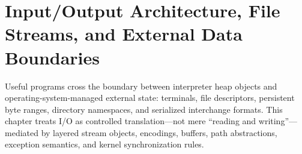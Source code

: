 \chapter{Input/Output Architecture, File Streams, and External Data Boundaries}

Useful programs cross the boundary between interpreter heap objects and operating-system-managed external state: terminals, file descriptors, persistent byte ranges, directory namespaces, and serialized interchange formats. This chapter treats I/O as controlled translation---not mere ``reading and writing''---mediated by layered stream objects, encodings, buffers, path abstractions, exception semantics, and kernel synchronization rules.
